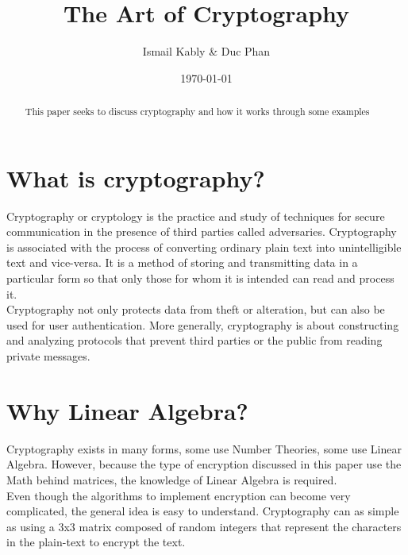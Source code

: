 \documentclass[11pt]{article}
\title{The Art of Cryptography}
\author{Ismail Kably \& Duc Phan}
\date{\today}
\affil{Portland Community College}
\begin{document}
\newenvironment{subs}
  {\adjustwidth{3em}{0pt}}
  {\endadjustwidth}

\maketitle


\begin{abstract}

This paper seeks to discuss cryptography and how it works through some examples

\end{abstract}

\section{What is cryptography?}
\phantom{x}\hspace{3mm}Cryptography or cryptology is the practice and study of techniques for secure communication in the presence of third parties called adversaries. Cryptography is associated with the process of converting ordinary plain text into unintelligible text and vice-versa. It is a method of storing and transmitting data in a particular form so that only those for whom it is intended can read and process it. \\
\phantom{x}\hspace{3mm}Cryptography not only protects data from theft or alteration, but can also be used for user authentication. More generally, cryptography is about constructing and analyzing protocols that prevent third parties or the public from reading private messages.\\


\section{Why Linear Algebra?}
\phantom{x}\hspace{3mm}Cryptography exists in many forms, some use Number Theories, some use Linear Algebra. However, because the type of encryption discussed in this paper use the Math behind matrices, the knowledge of Linear Algebra is required.\\
\phantom{x}\hspace{3mm}Even though the algorithms to implement encryption can become very complicated, the general idea is easy to understand. Cryptography can as simple as using a 3x3 matrix composed of random	integers that represent the characters in the plain-text to encrypt the text.
\pagebreak
\end{document}
